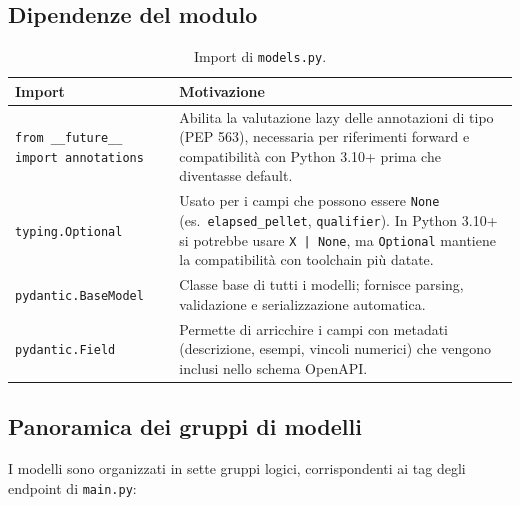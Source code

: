\documentclass[a4paper,12pt]{article}
\begin{document}
\subsection{Dipendenze del modulo}

\begin{table}[H]
\centering
\caption{Import di \texttt{models.py}.}
\begin{tabular}{L{4cm} L{8.5cm}}
\toprule
\textbf{Import} & \textbf{Motivazione} \\
\midrule
\texttt{from \_\allowbreak{}\_\allowbreak{}future\_\allowbreak{}\_\allowbreak{} import annotations} &
  Abilita la valutazione lazy delle annotazioni di tipo (PEP 563),
  necessaria per riferimenti forward e compatibilit\`{a} con Python 3.10+
  prima che diventasse default. \\[4pt]
\texttt{typing.Optional} &
  Usato per i campi che possono essere \texttt{None} (es.\
  \texttt{elapsed\_pellet}, \texttt{qualifier}). In Python 3.10+ si
  potrebbe usare \texttt{X | None}, ma \texttt{Optional} mantiene la
  compatibilit\`{a} con toolchain pi\`{u} datate. \\[4pt]
\texttt{pydantic.BaseModel} &
  Classe base di tutti i modelli; fornisce parsing, validazione e
  serializzazione automatica. \\[4pt]
\texttt{pydantic.Field} &
  Permette di arricchire i campi con metadati (descrizione,
  esempi, vincoli numerici) che vengono inclusi nello schema OpenAPI. \\
\bottomrule
\end{tabular}
\end{table}

\subsection{Panoramica dei gruppi di modelli}

I modelli sono organizzati in sette gruppi logici, corrispondenti
ai tag degli endpoint di \texttt{main.py}:
\end{document}
